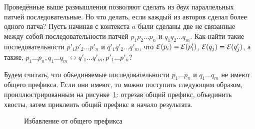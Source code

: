 Проведённые выше размышления позволяют сделать из \emph{двух}
параллельных патчей последовательные. Но что делать, если каждый из
авторов сделал более одного патча? Пусть начиная с контекста $a$ были
сделаны две не связанные между собой последовательности патчей
$p_1p_2\ldots p_n$ и $q_1q_2\ldots q_m$. Как найти такие
последовательности $p'_1p'_2\ldots p'_n$ и $q'_1q'_2\ldots q'_m$, что
${\cal E}(p_i) = {\cal E}(p'_i)$, ${\cal E}(q_j) = {\cal E}(q'_j)$, а
также, $p_1\ldots p_n, q_1\ldots q_m \longleftrightarrow q'_1\ldots
q'_m, p'_1\ldots p'_n$? 

Будем считать, что объединяемые последовательности $p_1\ldots p_n$ и
$q_1\ldots q_m$ не имеют общего префикса. Если они имеют, то можно
поступить следующим образом, проиллюстрированным на
рисунке~\ref{fig:manymerge-common-prefix}: отрезав общий префикс,
объединить хвосты, затем приклеить общий префикс в начало результата.

\begin{figure}
  \centering
  \begin{subfigure}{0.4\textwidth}
    \centering
  \end{subfigure}
  \begin{subfigure}{0.4\textwidth}
    \centering
  \end{subfigure}
  \caption{Избавление от общего префикса}
  \label{fig:manymerge-common-prefix}
\end{figure}

